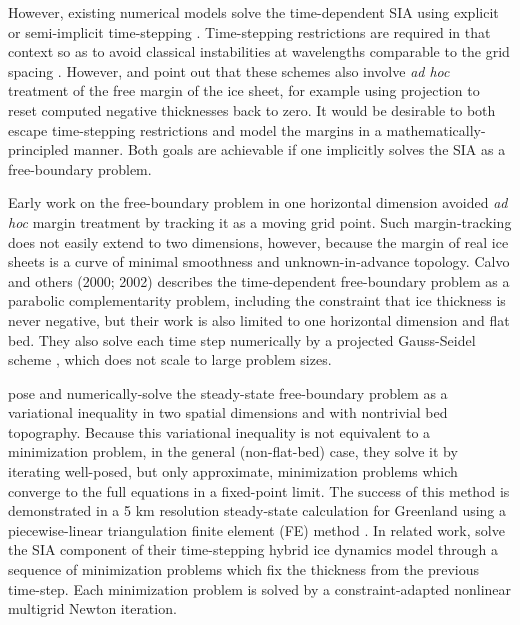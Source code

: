 \documentclass[review,letterpaper]{igs}
\begin{document}
However, existing numerical models solve the time-dependent SIA using explicit or semi-implicit time-stepping  \citep{HindmarshPayne1996,Huybrechtsetal1996,Bueleretal2005,EgholmNielsen2010,JaroschSchoofAnslow2013}.  Time-stepping restrictions are required in that context so as to avoid classical instabilities at wavelengths comparable to the grid spacing \citep{MortonMayers2005}.  However, \cite{Bueleretal2005} and \cite{JaroschSchoofAnslow2013} point out that these schemes also involve \emph{ad hoc} treatment of the free margin of the ice sheet, for example using projection to reset computed negative thicknesses back to zero.  It would be desirable to both escape time-stepping restrictions and model the margins in a mathematically-principled manner.  Both goals are achievable if one implicitly solves the SIA as a free-boundary problem.

Early work on the free-boundary problem in one horizontal dimension \citep{Hindmarshetal1987} avoided \emph{ad hoc} margin treatment by tracking it as a moving grid point.  Such margin-tracking does not easily extend to two dimensions, however, because the margin of real ice sheets is a curve of minimal smoothness and unknown-in-advance topology.  Calvo and others (2000; 2002) \nocite{CalvoDuranyVazquez2000,Calvoetal2002} describes the time-dependent free-boundary problem as a parabolic complementarity problem, including the constraint that ice thickness is never negative, but their work is also limited to one horizontal dimension and flat bed.  They also solve each time step numerically by a projected Gauss-Seidel scheme \citep{Ciarlet2002}, which does not scale to large problem sizes.

\cite{JouvetBueler2012} pose and numerically-solve the steady-state free-boundary problem as a variational inequality \citep{KinderlehrerStampacchia1980} in two spatial dimensions and with nontrivial bed topography.  Because this variational inequality is not equivalent to a minimization problem, in the general (non-flat-bed) case, they solve it by iterating well-posed, but only approximate, minimization problems which converge to the full equations in a fixed-point limit.  The success of this method is demonstrated in a 5 km resolution steady-state calculation for Greenland using a piecewise-linear triangulation finite element (FE) method \citep{Elmanetal2005}.  In related work, \cite{JouvetGraeser2013} solve the SIA component of their time-stepping hybrid \citep{Winkelmannetal2011} ice dynamics model through a sequence of minimization problems which fix the thickness from the previous time-step.  Each minimization problem is solved by a constraint-adapted nonlinear multigrid Newton iteration.
\end{document}
